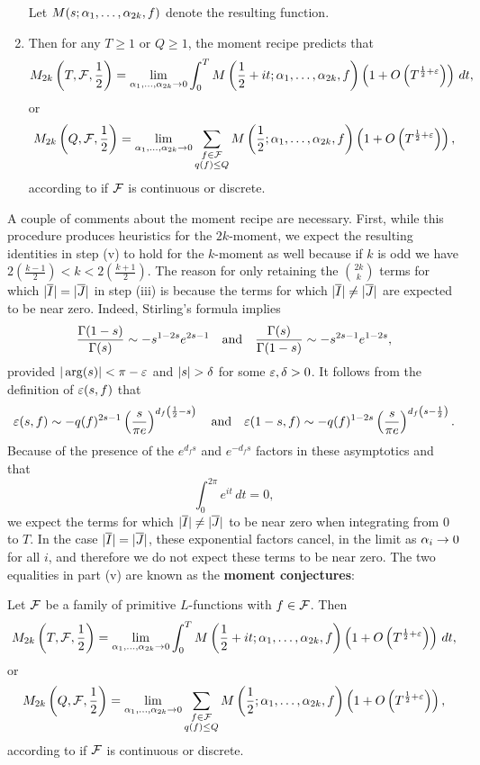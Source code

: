 \begin{enumerate}[label*=(\roman*)]
\[    \]
    Let $M(s;\alpha_{1},\ldots,\alpha_{2k},f)$ denote the resulting function.
    \item Then for any $T \ge 1$ or $Q \ge 1$, the moment recipe predicts that
    \[
      M_{2k}\left(T,\mathcal{F},\frac{1}{2}\right) = \lim_{\alpha_{1},\ldots,\alpha_{2k} \to 0}\int_{0}^{T}M\left(\frac{1}{2}+it;\alpha_{1},\ldots,\alpha_{2k},f\right)\left(1+O\left(T^{\frac{1}{2}+\varepsilon}\right)\right)\,dt,
    \]
    or
    \[
       M_{2k}\left(Q,\mathcal{F},\frac{1}{2}\right) = \lim_{\alpha_{1},\ldots,\alpha_{2k} \to 0}\sum_{\substack{f \in \mathcal{F} \\ q(f) \le Q}}M\left(\frac{1}{2};\alpha_{1},\ldots,\alpha_{2k},f\right)\left(1+O\left(T^{\frac{1}{2}+\varepsilon}\right)\right),
    \]
    according to if $\mathcal{F}$ is continuous or discrete.
  \end{enumerate}

  A couple of comments about the moment recipe are necessary. First, while this procedure produces heuristics for the $2k$-moment, we expect the resulting identities in step (v) to hold for the $k$-moment as well because if $k$ is odd we have $2\left(\frac{k-1}{2}\right) < k < 2\left(\frac{k+1}{2}\right)$. The reason for only retaining the $\binom{2k}{k}$ terms for which $|\overline{I}| = |\overline{J}|$ in step (iii) is because the terms for which $|\overline{I}| \neq |\overline{J}|$ are expected to be near zero. Indeed, Stirling's formula implies
  \[
    \frac{\Gamma(1-s)}{\Gamma(s)} \sim -s^{1-2s}e^{2s-1} \quad \text{and} \quad \frac{\Gamma(s)}{\Gamma(1-s)} \sim -s^{2s-1}e^{1-2s},
  \]
  provided $|\arg(s)| < \pi-\varepsilon$ and $|s| > \delta$ for some $\varepsilon,\delta > 0$. It follows from the definition of $\varepsilon(s,f)$ that
  \[
    \varepsilon(s,f) \sim -q(f)^{2s-1}\left(\frac{s}{\pi e}\right)^{d_{f}\left(\frac{1}{2}-s\right)} \quad \text{and} \quad \varepsilon(1-s,f) \sim -q(f)^{1-2s}\left(\frac{s}{\pi e}\right)^{d_{f}\left(s-\frac{1}{2}\right)}.
  \]
  Because of the presence of the $e^{d_{f}s}$ and $e^{-d_{f}s}$ factors in these asymptotics and that
  \[
    \int_{0}^{2\pi}e^{it}\,dt = 0,
  \]
  we expect the terms for which $|\overline{I}| \neq |\overline{J}|$ to be near zero when integrating from $0$ to $T$. In the case $|\overline{I}| = |\overline{J}|$, these exponential factors cancel, in the limit as $\alpha_{i} \to 0$ for all $i$, and therefore we do not expect these terms to be near zero. The two equalities in part (v) are known as the \textbf{moment conjectures}:

  \begin{conjecture}
    Let $\mathcal{F}$ be a family of primitive $L$-functions with $f \in \mathcal{F}$. Then
    \[
      M_{2k}\left(T,\mathcal{F},\frac{1}{2}\right) = \lim_{\alpha_{1},\ldots,\alpha_{2k} \to 0}\int_{0}^{T}M\left(\frac{1}{2}+it;\alpha_{1},\ldots,\alpha_{2k},f\right)\left(1+O\left(T^{\frac{1}{2}+\varepsilon}\right)\right)\,dt,
    \]
    or
    \[
       M_{2k}\left(Q,\mathcal{F},\frac{1}{2}\right) = \lim_{\alpha_{1},\ldots,\alpha_{2k} \to 0}\sum_{\substack{f \in \mathcal{F} \\ q(f) \le Q}}M\left(\frac{1}{2};\alpha_{1},\ldots,\alpha_{2k},f\right)\left(1+O\left(T^{\frac{1}{2}+\varepsilon}\right)\right),
    \]
    according to if $\mathcal{F}$ is continuous or discrete.
  \end{conjecture}
